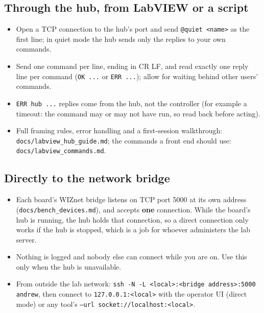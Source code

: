 \documentclass[11pt]{article}
\newcommand{\code}[1]{\texttt{#1}}
\newcommand{\file}[1]{\nolinkurl{#1}}
\begin{document}
\subsection{Through the hub, from LabVIEW or a script}
\begin{itemize}
  \item Open a TCP connection to the hub's port and send \code{@quiet <name>} as the first line; in quiet mode the hub sends only the replies to your own commands.
  \item Send one command per line, ending in CR LF, and read exactly one reply line per command (\code{OK ...} or \code{ERR ...}); allow for waiting behind other users' commands.
  \item \code{ERR hub ...} replies come from the hub, not the controller (for example a timeout: the command may or may not have run, so read back before acting).
  \item Full framing rules, error handling and a first-session walkthrough: \file{docs/labview_hub_guide.md}; the commands a front end should use: \file{docs/labview_commands.md}.
\end{itemize}

\subsection{Directly to the network bridge}
\begin{itemize}
  \item Each board's WIZnet bridge listens on TCP port 5000 at its own address (\file{docs/bench_devices.md}), and accepts \textbf{one} connection. While the board's hub is running, the hub holds that connection, so a direct connection only works if the hub is stopped, which is a job for whoever administers the lab server.
  \item Nothing is logged and nobody else can connect while you are on. Use this only when the hub is unavailable.
  \item From outside the lab network: \code{ssh -N -L <local>:<bridge address>:5000 andrew}, then connect to \code{127.0.0.1:<local>} with the operator UI (direct mode) or any tool's \code{--url socket://localhost:<local>}.
\end{itemize}
\end{document}
